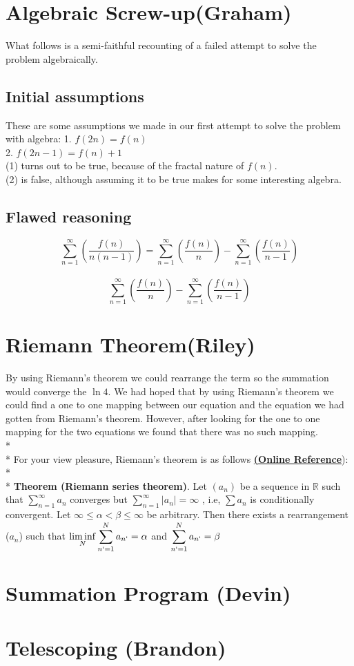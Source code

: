 \documentclass{article}
\begin{document}

\section{Algebraic Screw-up(Graham)}
What follows is a semi-faithful recounting of a failed attempt to solve the problem algebraically.
\subsection{Initial assumptions}
These are some assumptions we made in our first attempt to solve the problem with algebra:
1. $f(2n) = f(n)$\\
2. $f(2n-1) = f(n) + 1$\\

(1) turns out to be true, because of the fractal nature of $f(n)$.\\
(2) is false, although assuming it to be true makes for some interesting algebra.\\

\subsection{Flawed reasoning}
$$\sum_{n=1}^\infty \left( \frac{f(n)}{n(n-1)} \right)=\sum_{n=1}^\infty \left( \frac{f(n)}{n} \right)-\sum_{n=1}^\infty \left( \frac{f(n)}{n-1} \right)$$\\
$$\sum_{n=1}^\infty \left( \frac{f(n)}{n} \right)-\sum_{n=1}^\infty \left( \frac{f(n)}{n-1} \right)$$

\section{Riemann Theorem(Riley)}
By using Riemann's theorem we could rearrange the term so the summation would converge the $\ln 4$.  We had hoped that by using Riemann's theorem we could find a one to one mapping between our equation and the equation we had gotten from Riemann's theorem. However, after looking for the one to one mapping for the two equations we found that there was no such mapping.  
\\*
\\* For your view pleasure, Riemann's theorem is as follows \href{http://planetmath.org/encyclopedia/ConditionallyConvergentSeriesOfRealNumbersCanBeRearrangedToConvergeToAnyNumber.html}{{\bf (Online Reference}}):
\\*
\\*
{\bf Theorem (Riemann series theorem)}. Let $(a _{n})$ be a sequence in $\mathbb{R}$ such that $ \sum_{n=1}^{\infty} a _{n} $  converges but $ \sum_{n=1}^{\infty} |a _{n}| = \infty$ , i.e,  $ \sum a_{n} $ is conditionally convergent. Let $\infty \leq \alpha < \beta \leq \infty$  be arbitrary. Then there exists a rearrangement ($a _{n}$) such that $ \displaystyle\liminf_{N}   \sum_{n`=1}^{N} a _{n`} = \alpha$ and $\displaystyle\sum_{n`=1}^{N} a _{n`} = \beta$

\section{Summation Program (Devin)}

\section{Telescoping (Brandon)}
\end{document}
